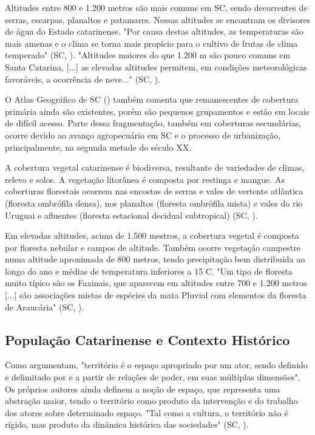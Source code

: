 \indent Altitudes entre 800 e 1.200 metros são mais comuns em \acrlong{SC}, sendo decorrentes de serras, escarpas, planaltos e patamares. Nessas altitudes se encontram os divisores de água do Estado catarinense. "Por causa destas altitudes, as temperaturas são mais amenas e o clima se torna mais propício para o cultivo de frutas de clima temperado" (\acrlong{SC}, \citeyear{AtlasSCnatureza}). "Altitudes maiores do que 1.200 m são pouco comuns em Santa Catarina, [...] as elevadas altitudes permitem, em condições meteorológicas favoráveis, a ocorrência de neve..." (\acrlong{SC}, \citeyear{AtlasSCnatureza}).

\indent  O Atlas Geográfico de \acrlong{SC} (\citeyear{AtlasSCnatureza}) também comenta que remanescentes de cobertura primária ainda são existentes, porém são pequenos grupamentos e estão em locais de difícil acesso. Parte dessa fragmentação, também em coberturas secundárias, ocorre devido ao avanço agropecuário em \acrlong{SC} e o  processo de urbanização, principalmente, na segunda metade do século XX.

\indent A cobertura vegetal catarinense é biodiversa, resultante de variedades de climas, relevo e solos. A vegetação litorânea é composta por restinga e mangue. As coberturas florestais ocorrem nas encostas de serras e vales de vertente atlântica (floresta ombrófila densa), nos planaltos (floresta ombrófila mista) e vales do rio Uruguai e afluentes (floresta estacional decidual subtropical) (\acrlong{SC}, \citeyear{AtlasSCnatureza}).

\indent Em elevadas altitudes, acima de 1.500 mestros, a cobertura vegetal é composta por floresta nebular e campos de altitude. Também ocorre vegetação campestre numa altitude aproximada de 800 metros, tendo precipitação bem distribuída ao longo do ano e médias de temperatura inferiores a 15 C. "Um tipo de floresta muito típico são os Faxinais, que aparecem em altitudes entre 700 e 1.200 metros [...] são associações mistas de espécies da mata Pluvial com elementos da floresta de Araucária" (\acrlong{SC}, \citeyear{AtlasSCnatureza}).

\subsection{População Catarinense e Contexto Histórico}

\indent Como  argumentam, "território é o espaço apropriado por um ator, sendo definido e delimitado por e a partir de relações de poder, em suas múltiplas dimensões". Os próprios autores ainda definem a noção de espaço, que representa uma abstração maior, tendo o território como produto da intervenção e do trabalho dos atores sobre determinado espaço. "Tal como a cultura, o território não é rígido, mas produto da dinâmica histórica das sociedades" (\acrlong{SC}, \citeyear{AtlasSCpopulacao}).

